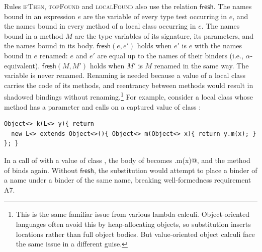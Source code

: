Rules \textsc{ifThen}, \textsc{topFound} and \textsc{localFound} also use the relation $\mathsf{fresh}$.
The names bound in an expression $e$ are the variable of every type test occurring in $e$, and the names bound in every method of a local class occurring in $e$.
The names bound in a method $M$ are the type variables of its signature, its parameters, and the names bound in its body.
$\mathsf{fresh}(e,e')$ holds when $e'$ is $e$ with the names bound in $e$ renamed: $e$ and $e'$ are equal up to the names of their binders (i.e., $\alpha$-equivalent).
$\mathsf{fresh}(M,M')$ holds when $M'$ is $M$ renamed in the same way.
The variable \Q@this@ is never renamed.
Renaming is needed because a value of a local class carries the code of its methods, and reentrancy between methods would result in shadowed bindings without renaming.\footnote{This is the same familiar issue from various lambda calculi. Object-oriented languages often avoid this by heap-allocating objects, so substitution inserts locations rather than full object bodies. But value-oriented object calculi face the same issue in a different guise.}
For example, consider a local class \Q@L@ whose method \Q@m@ has a parameter \Q@x@ and calls \Q@m@ on a captured value \Q@y@ of class \Q@L@:
\begin{lstlisting}
Object<> k(L<> y){ return
  new L<> extends Object<>(){ Object<> m(Object<> x){ return y.m(x); } }; }
\end{lstlisting}
In a call of \Q@k@ with a value \Q@v@ of class \Q@L@, the body of \Q@m@ becomes \Q@v.m(x)@, and the method \Q@m@ of \Q@v@ binds \Q@x@ again.
Without $\mathsf{fresh}$, the substitution would attempt to place a binder of a name under a binder of the same name, breaking well-formedness requirement A7.

